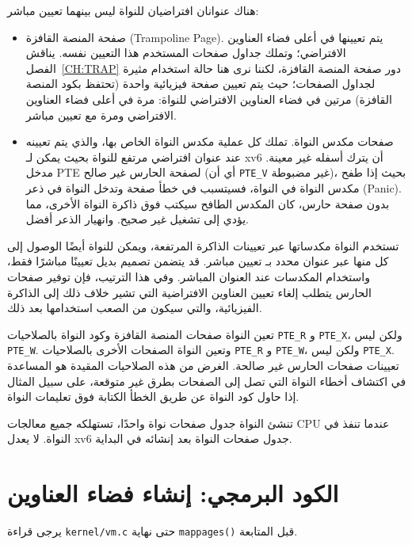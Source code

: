 هناك عنوانان افتراضيان للنواة ليس بينهما تعيين مباشر:
\begin{itemize}
  \item صفحة المنصة القافزة (Trampoline Page). يتم تعيينها في أعلى فضاء العناوين الافتراضي؛ وتملك جداول صفحات المستخدم هذا التعيين نفسه. يناقش الفصل~\ref{CH:TRAP} دور صفحة المنصة القافزة، لكننا نرى هنا حالة استخدام مثيرة لجداول الصفحات؛ حيث يتم تعيين صفحة فيزيائية واحدة (تحتفظ بكود المنصة القافزة) مرتين في فضاء العناوين الافتراضي للنواة: مرة في أعلى فضاء العناوين الافتراضي ومرة مع تعيين مباشر.
  \item صفحات مكدس النواة. تملك كل عملية مكدس النواة الخاص بها، والذي يتم تعيينه عند عنوان افتراضي مرتفع للنواة بحيث يمكن لـ xv6 أن يترك أسفله  غير معينة. مدخل PTE لصفحة الحارس غير صالح (أي أن \lstinline{PTE_V} غير مضبوطة)، بحيث إذا طفح مكدس النواة في النواة، فسيتسبب في خطأ صفحة وتدخل النواة في ذعر (Panic). بدون صفحة حارس، كان المكدس الطافح سيكتب فوق ذاكرة النواة الأخرى، مما يؤدي إلى تشغيل غير صحيح. وانهيار الذعر أفضل.
\end{itemize}

تستخدم النواة مكدساتها عبر تعيينات الذاكرة المرتفعة، ويمكن للنواة أيضًا الوصول إلى كل منها عبر عنوان محدد بـ تعيين مباشر.
قد يتضمن تصميم بديل تعيينًا مباشرًا فقط، واستخدام المكدسات عند العنوان المباشر. وفي هذا الترتيب، فإن توفير صفحات الحارس يتطلب إلغاء تعيين العناوين الافتراضية التي تشير خلاف ذلك إلى الذاكرة الفيزيائية، والتي سيكون من الصعب استخدامها بعد ذلك.

تعين النواة صفحات المنصة القافزة وكود النواة بالصلاحيات \lstinline{PTE_R} و \lstinline{PTE_X}، ولكن ليس \lstinline{PTE_W}.
وتعين النواة الصفحات الأخرى بالصلاحيات \lstinline{PTE_R} و \lstinline{PTE_W}، ولكن ليس \lstinline{PTE_X}.
تعيينات صفحات الحارس غير صالحة.
الغرض من هذه الصلاحيات المقيدة هو المساعدة في اكتشاف أخطاء النواة التي تصل إلى الصفحات بطرق غير متوقعة، على سبيل المثال إذا حاول كود النواة عن طريق الخطأ الكتابة فوق تعليمات النواة.

تنشئ النواة جدول صفحات نواة واحدًا، تستهلكه جميع معالجات CPU عندما تنفذ في النواة. لا يعدل xv6 جدول صفحات النواة بعد إنشائه في البداية.

\section{الكود البرمجي: إنشاء فضاء العناوين}
\label{sec:code_creating_address_space}

يرجى قراءة \lstinline{kernel/vm.c}  حتى نهاية \texttt{mappages()} قبل المتابعة.


